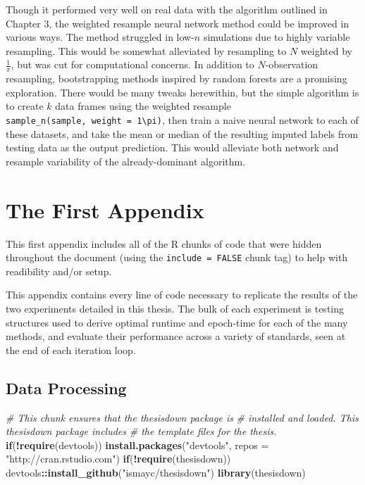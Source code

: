 \documentclass[12pt,twoside]{reedthesis}
\newenvironment{Shaded}{\begin{snugshade}}{\end{snugshade}}
\newcommand{\KeywordTok}[1]{\textcolor[rgb]{0.13,0.29,0.53}{\textbf{#1}}}
\newcommand{\DataTypeTok}[1]{\textcolor[rgb]{0.13,0.29,0.53}{#1}}
\newcommand{\StringTok}[1]{\textcolor[rgb]{0.31,0.60,0.02}{#1}}
\newcommand{\CommentTok}[1]{\textcolor[rgb]{0.56,0.35,0.01}{\textit{#1}}}
\newcommand{\ControlFlowTok}[1]{\textcolor[rgb]{0.13,0.29,0.53}{\textbf{#1}}}
\newcommand{\OperatorTok}[1]{\textcolor[rgb]{0.81,0.36,0.00}{\textbf{#1}}}
\newcommand{\NormalTok}[1]{#1}
\begin{document}
Though it performed very well on real data with the algorithm outlined
in Chapter 3, the weighted resample neural network method could be
improved in various ways. The method struggled in low-\(n\) simulations
due to highly variable resampling. This would be somewhat alleviated by
resampling to \(N\) weighted by \(\frac{1}{\pi}\), but was cut for
computational concerns. In addition to \(N\)-observation resampling,
bootstrapping methods inspired by random forests are a promising
exploration. There would be many tweaks herewithin, but the simple
algorithm is to create \(k\) data frames using the weighted resample
\texttt{sample\_n(sample,\ weight\ =\ 1\textbackslash{}pi)}, then train
a naive neural network to each of these datasets, and take the mean or
median of the resulting imputed labels from testing data as the output
prediction. This would alleviate both network and resample variability
of the already-dominant algorithm.

\appendix

\chapter{The First Appendix}\label{the-first-appendix}

This first appendix includes all of the R chunks of code that were
hidden throughout the document (using the \texttt{include\ =\ FALSE}
chunk tag) to help with readibility and/or setup.

This appendix contains every line of code necessary to replicate the
results of the two experiments detailed in this thesis. The bulk of each
experiment is testing structures used to derive optimal runtime and
epoch-time for each of the many methods, and evaluate their performance
across a variety of standards, seen at the end of each iteration loop.

\section{Data Processing}\label{sec:data_process}
\begin{Shaded}
\begin{Highlighting}[]
\CommentTok{# This chunk ensures that the thesisdown package is}
\CommentTok{# installed and loaded. This thesisdown package includes}
\CommentTok{# the template files for the thesis.}
\ControlFlowTok{if}\NormalTok{(}\OperatorTok{!}\KeywordTok{require}\NormalTok{(devtools))}
  \KeywordTok{install.packages}\NormalTok{(}\StringTok{"devtools"}\NormalTok{, }\DataTypeTok{repos =} \StringTok{"http://cran.rstudio.com"}\NormalTok{)}
\ControlFlowTok{if}\NormalTok{(}\OperatorTok{!}\KeywordTok{require}\NormalTok{(thesisdown))}
\NormalTok{  devtools}\OperatorTok{::}\KeywordTok{install_github}\NormalTok{(}\StringTok{"ismayc/thesisdown"}\NormalTok{)}
\KeywordTok{library}\NormalTok{(thesisdown)}
\end{Highlighting}
\end{Shaded}
\end{document}
